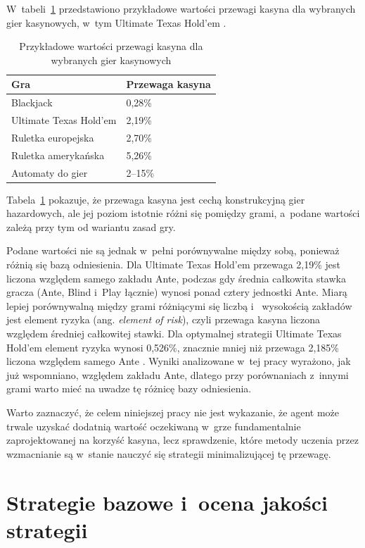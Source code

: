 W~tabeli~\ref{tab:house_edge_examples} przedstawiono przykładowe wartości przewagi kasyna dla wybranych gier kasynowych,
w~tym Ultimate Texas Hold’em \cite{wizard_house_edge}.
\begin{table}[h]
\centering
\caption{Przykładowe wartości przewagi kasyna dla wybranych gier kasynowych}
\label{tab:house_edge_examples}
\begin{tabular}{ll}
\toprule
Gra & Przewaga kasyna \\
\midrule
Blackjack & 0{,}28\% \\
Ultimate Texas Hold’em & 2{,}19\% \\
Ruletka europejska & 2{,}70\% \\
Ruletka amerykańska & 5{,}26\% \\
Automaty do gier & 2--15\% \\
\bottomrule
\end{tabular}
\end{table}

Tabela~\ref{tab:house_edge_examples} pokazuje, że przewaga kasyna jest cechą
konstrukcyjną gier hazardowych, ale jej poziom istotnie różni się pomiędzy
grami, a~podane wartości zależą przy tym od wariantu zasad gry.

Podane wartości nie są jednak w~pełni porównywalne między sobą, ponieważ
różnią się bazą odniesienia. Dla Ultimate Texas Hold'em przewaga 2,19\%
jest liczona względem samego zakładu Ante, podczas gdy średnia całkowita
stawka gracza (Ante, Blind i~Play łącznie) wynosi ponad cztery jednostki
Ante. Miarą lepiej porównywalną między grami różniącymi się liczbą i~
wysokością zakładów jest element ryzyka (ang. \emph{element of risk}), czyli
przewaga kasyna liczona względem średniej całkowitej stawki. Dla optymalnej
strategii Ultimate Texas Hold'em element ryzyka wynosi 0,526\%, znacznie
mniej niż przewaga 2,185\% liczona względem samego Ante \cite{wizard_uth}.
Wyniki analizowane w~tej pracy wyrażono, jak już wspomniano, względem
zakładu Ante, dlatego przy porównaniach z~innymi grami warto mieć na
uwadze tę różnicę bazy odniesienia.

Warto zaznaczyć, że celem niniejszej pracy nie jest wykazanie, że agent
może trwale uzyskać dodatnią wartość oczekiwaną w~grze fundamentalnie zaprojektowanej na
korzyść kasyna, lecz sprawdzenie, które metody uczenia przez wzmacnianie są
w~stanie nauczyć się strategii minimalizującej tę przewagę.

\section{Strategie bazowe i~ocena jakości strategii}

